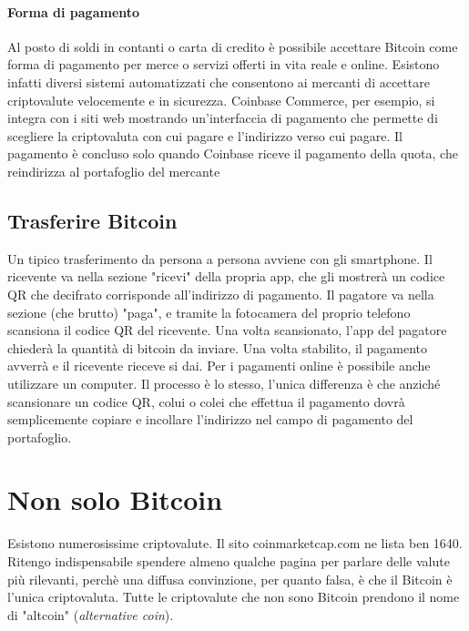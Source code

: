 \documentclass {article}
\begin{document}
\paragraph {Forma di pagamento}

Al posto di soldi in contanti o carta di credito è possibile accettare Bitcoin come forma di pagamento per merce o servizi offerti in vita reale e online.
Esistono infatti diversi sistemi automatizzati che consentono ai mercanti di accettare criptovalute velocemente e in sicurezza.
Coinbase Commerce, per esempio, si integra con i siti web mostrando un'interfaccia di pagamento che permette di scegliere la criptovaluta con cui pagare e l'indirizzo verso cui pagare. Il pagamento è concluso solo quando Coinbase riceve il pagamento della quota, che reindirizza al portafoglio del mercante


\subsection {Trasferire Bitcoin}


Un tipico trasferimento da persona a persona avviene con gli smartphone.
Il ricevente va nella sezione "ricevi" della propria app, che gli mostrerà un codice QR che decifrato corrisponde all'indirizzo di pagamento.
Il pagatore va nella sezione (che brutto) "paga", e tramite la fotocamera del proprio telefono scansiona il codice QR del ricevente.
Una volta scansionato, l'app del pagatore chiederà la quantità di bitcoin da inviare. Una volta stabilito, il pagamento avverrà e il ricevente rieceve si dai.
Per i pagamenti online è possibile anche utilizzare un computer. Il processo è lo stesso, l'unica differenza è che anziché scansionare un codice QR, colui o colei che effettua il pagamento dovrà semplicemente copiare e incollare l'indirizzo nel campo di pagamento del portafoglio.


\newpage


\section {Non solo Bitcoin}


Esistono numerosissime criptovalute. Il sito coinmarketcap.com ne lista ben 1640. Ritengo indispensabile spendere almeno qualche pagina per parlare delle valute più rilevanti, perchè una diffusa convinzione, per quanto falsa, è che il Bitcoin è l'unica criptovaluta. Tutte le criptovalute che non sono Bitcoin prendono il nome di "altcoin" (\textit{alternative coin}).
\end{document}
